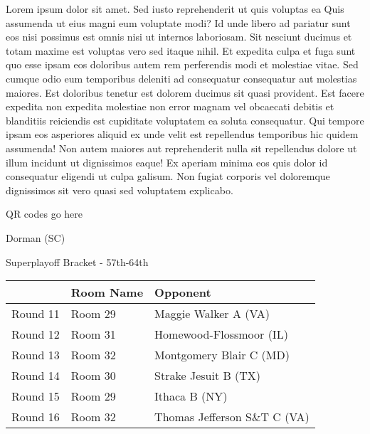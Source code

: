 \documentclass{article}%
\begin{document}
\vspace*{8pt}%
\linebreak%
\newline%
\newline%
    Lorem ipsum dolor sit amet. Sed iusto reprehenderit ut quis voluptas ea Quis assumenda ut eius magni eum voluptate modi? Id unde libero ad pariatur sunt eos nisi possimus est omnis nisi ut internos laboriosam. Sit nesciunt ducimus et totam maxime est voluptas vero sed itaque nihil. Et expedita culpa et fuga sunt quo esse ipsam eos doloribus autem rem perferendis modi et molestiae vitae.\newline%
\newline%
    Sed cumque odio eum temporibus deleniti ad consequatur consequatur aut molestias maiores. Est doloribus tenetur est dolorem ducimus sit quasi provident. Est facere expedita non expedita molestiae non error magnam vel obcaecati debitis et blanditiis reiciendis est cupiditate voluptatem ea soluta consequatur. Qui tempore ipsam eos asperiores aliquid ex unde velit est repellendus temporibus hic quidem assumenda!\newline%
\newline%
    Non autem maiores aut reprehenderit nulla sit repellendus dolore ut illum incidunt ut dignissimos eaque! Ex aperiam minima eos quis dolor id consequatur eligendi ut culpa galisum. Non fugiat corporis vel doloremque dignissimos sit vero quasi sed voluptatem explicabo.\newline%
\newline%
\vspace*{30pt}%
\begin{center}%
\begin{Huge}%
QR codes go here%
\end{Huge}%
\end{center}%
\newpage%
\begin{center}%
\begin{Huge}%
Dorman (SC)%
\end{Huge}%
\vspace*{8pt}%
\linebreak%
\begin{Large}%
Superplayoff Bracket {-} 57th{-}64th%
\end{Large}%
\end{center}%
%
\begin{tabularx}{\textwidth}{|c|Y|Y|}%
\hline%
&Room Name&Opponent\\%
\hline%
Round 11&Room 29&Maggie Walker A (VA)\\%
Round 12&Room 31&Homewood{-}Flossmoor (IL)\\%
Round 13&Room 32&Montgomery Blair C (MD)\\%
Round 14&Room 30&Strake Jesuit B (TX)\\%
Round 15&Room 29&Ithaca B (NY)\\%
Round 16&Room 32&Thomas Jefferson S\&T C (VA)\\%
\hline%
\end{tabularx}%
\end{document}
